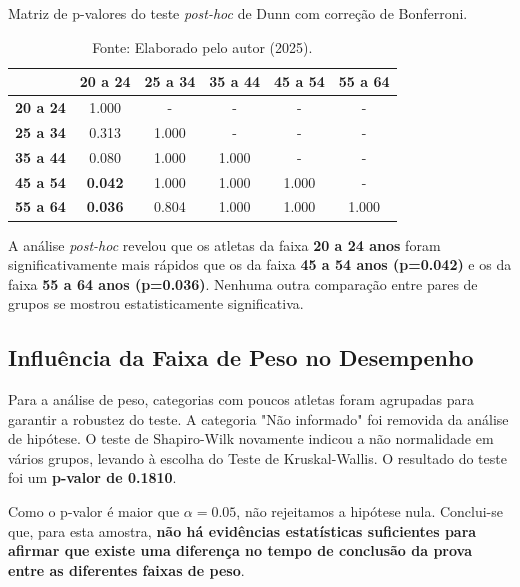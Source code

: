 \begin{table}[H]
\centering
\caption{Matriz de p-valores do teste \textit{post-hoc} de Dunn com correção de Bonferroni.}
\label{tab:dunn_faixa_etaria}
\begin{tabular}{lccccc}
\toprule
 & \textbf{20 a 24} & \textbf{25 a 34} & \textbf{35 a 44} & \textbf{45 a 54} & \textbf{55 a 64} \\
\midrule
\textbf{20 a 24} & 1.000 & - & - & - & - \\
\textbf{25 a 34} & 0.313 & 1.000 & - & - & - \\
\textbf{35 a 44} & 0.080 & 1.000 & 1.000 & - & - \\
\textbf{45 a 54} & \textbf{0.042} & 1.000 & 1.000 & 1.000 & - \\
\textbf{55 a 64} & \textbf{0.036} & 0.804 & 1.000 & 1.000 & 1.000 \\
\bottomrule
\end{tabular}
\caption*{Fonte: Elaborado pelo autor (2025).}
\end{table}

A análise \textit{post-hoc} revelou que os atletas da faixa \textbf{20 a 24 anos} foram significativamente mais rápidos que os da faixa \textbf{45 a 54 anos (p=0.042)} e os da faixa \textbf{55 a 64 anos (p=0.036)}. Nenhuma outra comparação entre pares de grupos se mostrou estatisticamente significativa.

\subsection{Influência da Faixa de Peso no Desempenho}

Para a análise de peso, categorias com poucos atletas foram agrupadas para garantir a robustez do teste. A categoria "Não informado" foi removida da análise de hipótese. O teste de Shapiro-Wilk novamente indicou a não normalidade em vários grupos, levando à escolha do Teste de Kruskal-Wallis. O resultado do teste foi um \textbf{p-valor de 0.1810}.

Como o p-valor é maior que $\alpha=0.05$, não rejeitamos a hipótese nula. Conclui-se que, para esta amostra, \textbf{não há evidências estatísticas suficientes para afirmar que existe uma diferença no tempo de conclusão da prova entre as diferentes faixas de peso}.

